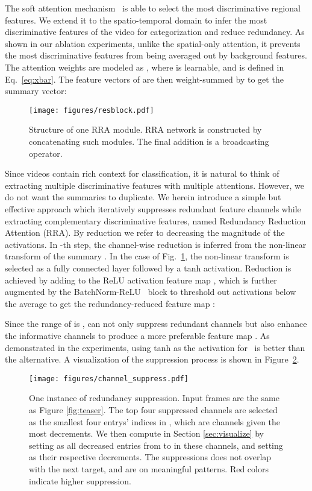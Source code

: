 \documentclass[runningheads]{llncs}
\begin{document}
The soft attention mechanism~\cite{fukui2016multimodal,xu2015show} is able to select the most discriminative regional features. We extend it to the spatio-temporal domain to infer the most discriminative features of the video for categorization and reduce redundancy. 
As shown in our ablation experiments, unlike the spatial-only attention, it prevents the most discriminative features from being averaged out by background features. The attention weights  are modeled as , 
where  is learnable, and  is defined in Eq.~\ref{eq:xbar}. The feature vectors of  are then weight-summed by  to get the summary vector:


\begin{figure}[htbp]
\centering
\texttt{[image: figures/resblock.pdf]}
\caption{Structure of one RRA module. RRA network is constructed by concatenating such modules. The final addition is a broadcasting operator.}
\label{fig:resblock}
\end{figure}

Since videos contain rich context for classification, it is natural to think of extracting multiple discriminative features with multiple attentions. 
However, we do not want the summaries to duplicate. 
We herein introduce a simple but effective approach which iteratively suppresses redundant feature channels while extracting complementary discriminative features, named Redundancy Reduction Attention (RRA). 
By reduction we refer to decreasing the magnitude of the activations. 
In -th step, the channel-wise reduction  is inferred from the non-linear transform of the summary . 
In the case of Fig.~\ref{fig:resblock}, the non-linear transform is selected as a fully connected layer followed by a tanh activation. Reduction is achieved by adding  to the ReLU activation feature map , which is further augmented by the BatchNorm-ReLU~\cite{ioffe2015batch} block to threshold out activations below the average to get the redundancy-reduced feature map : 

Since the range of  is ,  can not only suppress redundant channels but also enhance the informative channels to produce a more preferable feature map . As demonstrated in the experiments, using tanh as the activation for~ is better than the  alternative. 
A visualization of the suppression process is shown in Figure~\ref{fig:suppress}. 



\begin{figure}[t]
\centering
\texttt{[image: figures/channel\_suppress.pdf]}
\caption{One instance of redundancy suppression. Input frames are the same as Figure \ref{fig:teaser}. The top four suppressed channels are selected as the smallest four entrys' indices in , which are channels given the most decrements. We then compute  in Section \ref{sec:visualize} by setting  as all decreased entries from  to  in these channels, and setting  as their respective decrements. The suppressions does not overlap with the next target, and are on meaningful patterns. Red colors indicate higher suppression. }
\label{fig:suppress}
\end{figure}
\end{document}
